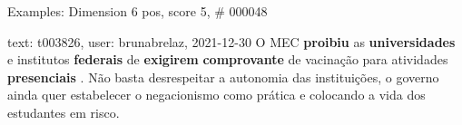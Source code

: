 \begin{frame}{Examples: Dimension 6 pos, score 5, \# 000048}
\footnotesize
\begin{exampleblock}{text: t003826, user: brunabrelaz, 2021-12-30}
O MEC \textbf{proibiu} as \textbf{universidades} e institutos \textbf{federais} 
de \textbf{exigirem} \textbf{comprovante} de vacinação para atividades 
\textbf{presenciais} . Não basta desrespeitar a autonomia das instituições, o 
governo ainda quer estabelecer o negacionismo como prática e colocando a vida 
dos estudantes em risco. 
\end{exampleblock}
\end{frame}
